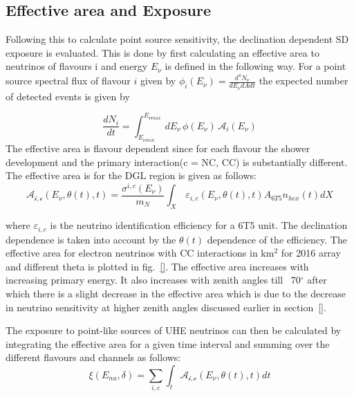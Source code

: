\subsection{Effective area and Exposure}
\label{subsec:psource_area}
Following this to calculate point source sensitivity, the declination dependent SD exposure is evaluated. This is done by first calculating an effective area to neutrinos of flavours i and energy $E_{\nu}$ is defined in the following way. For a point source spectral flux of flavour $i$ given by $\phi_i(E_{\nu}) = \frac{d^4 N_{\nu}}{dE_{\nu} dA dt}$ the expected number of detected events is given by 

\begin{equation}
  \frac{dN_{i}}{dt} = \int_{E_{\nu min}}^{E_{\nu max}} \, dE_{\nu} \, \phi(E_{\nu}) \, \mathcal{A}_i(E_{\nu})
\end{equation}
The effective area is flavour dependent since for each flavour the shower development and the primary interaction(c = NC, CC) is substantially different. The effective area is for the DGL region is given as follows:
\begin{equation}
  \mathcal{A_{i,c}}(E_{\nu},\theta(t),t) = \frac{\sigma^{i,c}(E_{\nu})}{m_N} \int_{X} \, \varepsilon_{i,c}(E_{\nu},\theta(t),t) A_{6T5} n_{hex}(t) dX
\end{equation}

where $\varepsilon_{i,c}$ is the neutrino identification efficiency for a 6T5 unit. The declination dependence is taken into account by the $\theta(t)$ dependence of the efficiency. The effective area for electron neutrinos with CC interactions in km$^2$ for 2016 array and different theta is plotted in fig.~\ref{}. The effective area increases with increasing primary energy. It also increases with zenith angles till ~70$^\circ$ after which there is a slight decrease in the effective area which is due to the decrease in neutrino sensitivity at higher zenith angles discussed earlier in section~\ref{}. 

The exposure to point-like sources of UHE neutrinos can then be calculated by integrating the effective area for a given time interval and summing over the different flavours and channels as follows:
\begin{equation}
  \xi(E_{nu}, \delta) = \sum_{i,c} \int_{t} \mathcal{A_{i,c}}(E_{\nu},\theta(t),t) dt
\end{equation}

